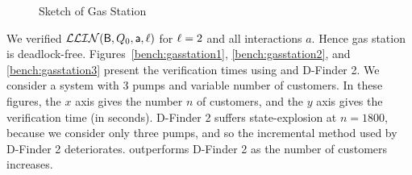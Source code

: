\begin{figure}[ht]
\begin{center}
\scalebox{0.5}{}
\caption{Sketch of Gas Station}
\label{fig:gas-station}
\end{center}
\end{figure}


We verified $\mathcal{LLIN}(\mathsf{B}, Q_0, \mathsf{a}, \ell)$ for $\ell=2$ and all interactions $a$.
Hence gas station is deadlock-free.  Figures~\ref{bench:gasstation1},
\ref{bench:gasstation2}, and \ref{bench:gasstation3} present the verification
times using \ldfctool and D-Finder 2. We consider a system with 3 pumps and variable number
of customers.  In these figures, the $x$ axis gives the number $n$ of
customers, and the $y$ axis gives the verification time (in seconds).
%
D-Finder 2 suffers state-explosion at $n = 1800$,
because we consider only three pumps, and so the incremental method used by
D-Finder 2 deteriorates. \ldfctool outperforms D-Finder 2 as the number of
customers increases.


